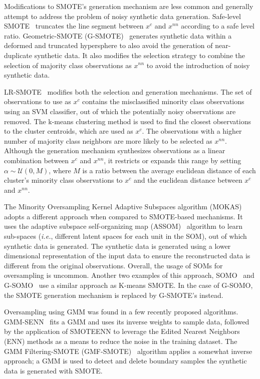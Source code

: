 Modifications to SMOTE's generation mechanism are less common and generally
attempt to address the problem of noisy synthetic data generation. Safe-level
SMOTE~\cite{bunkhumpornpat2009safe} truncates the line segment between $x^c$
and $x^{nn}$ according to a safe level ratio. Geometric-SMOTE
(G-SMOTE)~\cite{douzas2019geometric} generates synthetic data within a
deformed and truncated hypersphere to also avoid the generation of
near-duplicate synthetic data. It also modifies the selection strategy to
combine the selection of majority class observations as $x^{nn}$ to avoid the
introduction of noisy synthetic data. 

LR-SMOTE~\cite{liang2020lr} modifies both the selection and generation
mechanisms. The set of observations to use as $x^c$ contains the misclassified
minority class observations using an SVM classifier, out of which the
potentially noisy observations are removed. The k-means clustering method is
used to find the closest observations to the cluster centroids, which are used
as $x^c$. The observations with a higher number of majority class neighbors
are more likely to be selected as $x^{nn}$. Although the generation mechanism
synthesizes observations as a linear combination between $x^c$ and $x^{nn}$,
it restricts or expands this range by setting $\alpha \sim \mathcal{U}(0, M)$,
where $M$ is a ratio between the average euclidean distance of each cluster's
minority class observations to $x^c$ and the euclidean distance between $x^c$
and $x^{nn}$.

The Minority Oversampling Kernel Adaptive Subspaces algorithm
(MOKAS)~\cite{lin2017minority} adopts a different approach when compared to
SMOTE-based mechanisms. It uses the adaptive subspace self-organizing map
(ASSOM)~\cite{kohonen1996emergence} algorithm to learn sub-spaces
(\textit{i.e.}, different latent spaces for each unit in the SOM), out of
which synthetic data is generated. The synthetic data is generated using a
lower dimensional representation of the input data to ensure the reconstructed
data is different from the original observations. Overall, the usage of SOMs
for oversampling is uncommon. Another two examples of this approach,
SOMO~\cite{douzas2017self} and G-SOMO~\cite{douzas2021g} use a similar
approach as K-means SMOTE\@. In the case of G-SOMO, the SMOTE
generation mechanism is replaced by G-SMOTE's instead.

Oversampling using GMM was found in a few recently proposed algorithms.
GMM-SENN~\cite{xing2022predict} fits a GMM and uses its inverse weights to
sample data, followed by the application of SMOTEENN to leverage the Edited
Nearest Neighbors (ENN) methods as a means to reduce the noise in the training
dataset. The GMM Filtering-SMOTE (GMF-SMOTE)~\cite{xu2022synthetic} algorithm
applies a somewhat inverse approach; a GMM is used to detect and delete
boundary samples the synthetic data is generated with SMOTE.

